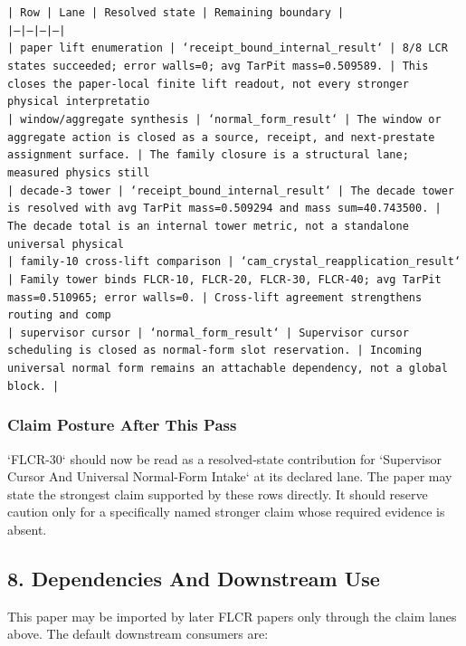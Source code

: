\documentclass[11pt]{article}
\begin{document}
\noindent\texttt{| Row | Lane | Resolved state | Remaining boundary |}\\
\noindent\texttt{|---|---|---|---|}\\
\noindent\texttt{| paper lift enumeration | `receipt\_bound\_internal\_result` | 8/8 LCR states succeeded; error walls=0; avg TarPit mass=0.509589. | This closes the paper-local finite lift readout, not every stronger physical interpretatio}\\
\noindent\texttt{| window/aggregate synthesis | `normal\_form\_result` | The window or aggregate action is closed as a source, receipt, and next-prestate assignment surface. | The family closure is a structural lane; measured physics still}\\
\noindent\texttt{| decade-3 tower | `receipt\_bound\_internal\_result` | The decade tower is resolved with avg TarPit mass=0.509294 and mass sum=40.743500. | The decade total is an internal tower metric, not a standalone universal physical }\\
\noindent\texttt{| family-10 cross-lift comparison | `cam\_crystal\_reapplication\_result` | Family tower binds FLCR-10, FLCR-20, FLCR-30, FLCR-40; avg TarPit mass=0.510965; error walls=0. | Cross-lift agreement strengthens routing and comp}\\
\noindent\texttt{| supervisor cursor | `normal\_form\_result` | Supervisor cursor scheduling is closed as normal-form slot reservation. | Incoming universal normal form remains an attachable dependency, not a global block. |}\\

\subsubsection*{Claim Posture After This Pass}

`FLCR-30` should now be read as a resolved-state contribution for `Supervisor Cursor And Universal Normal-Form Intake` at its declared lane. The paper may state the strongest claim supported by these rows directly. It should reserve caution only for a specifically named stronger claim whose required evidence is absent.

\subsection*{8. Dependencies And Downstream Use}

This paper may be imported by later FLCR papers only through the claim lanes
above. The default downstream consumers are:
\end{document}
